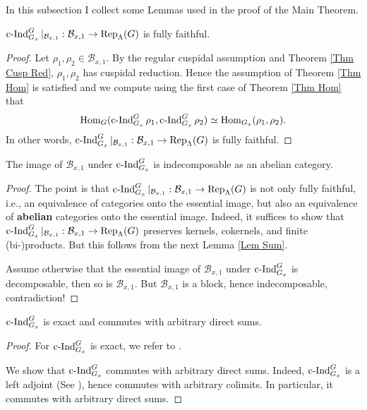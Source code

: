 	In this subsection I collect some Lemmas used in the proof of the Main Theorem.
	
	\begin{lemma}\label{Lem Thm Hom implies fully faithful}
		$\operatorname{\operatorname{c-Ind}}_{G_x}^G|_{\mathcal{B}_{x,1}}: \mathcal{B}_{x,1} \to \operatorname{\operatorname{Rep}}_{\Lambda}(G)$ is fully faithful.
	\end{lemma}
	
	\begin{proof}
		Let $\rho_1, \rho_2 \in \mathcal{B}_{x,1}$. By the regular cuspidal assumption and Theorem \ref{Thm Cusp Red}, $\rho_1, \rho_2$ has cuspidal reduction. Hence the assumption of Theorem \ref{Thm Hom} is satisfied and we compute using the first case of Theorem \ref{Thm Hom} that
		$$\operatorname{\operatorname{Hom}}_G(\operatorname{\operatorname{c-Ind}}_{G_x}^G\rho_1, \operatorname{\operatorname{c-Ind}}_{G_x}^G\rho_2) \simeq \operatorname{\operatorname{Hom}}_{G_x}(\rho_1, \rho_2).$$
		In other words, $\operatorname{\operatorname{c-Ind}}_{G_x}^G|_{\mathcal{B}_{x,1}}: \mathcal{B}_{x,1} \to \operatorname{\operatorname{Rep}}_{\Lambda}(G)$ is fully faithful.
	\end{proof}
	
	\begin{lemma}\label{Lem Indec}
		The image of $\mathcal{B}_{x,1}$ under $\operatorname{\operatorname{c-Ind}}_{G_x}^G$ is indecomposable as an abelian category.
	\end{lemma}
	
	\begin{proof}
		The point is that $\operatorname{\operatorname{c-Ind}}_{G_x}^G|_{\mathcal{B}_{x,1}}: \mathcal{B}_{x,1} \to \operatorname{\operatorname{Rep}}_{\Lambda}(G)$ is not only fully faithful, i.e., an equivalence of categories onto the essential image, but also an equivalence of \textbf{abelian} categories onto the essential image. Indeed, it suffices to show that $\operatorname{\operatorname{c-Ind}}_{G_x}^G|_{\mathcal{B}_{x,1}}: \mathcal{B}_{x,1} \to \operatorname{\operatorname{Rep}}_{\Lambda}(G)$ preserves kernels, cokernels, and finite (bi-)products. But this follows from the next Lemma \ref{Lem Sum}.
		
		Assume otherwise that the essential image of $\mathcal{B}_{x,1}$ under $\operatorname{\operatorname{c-Ind}}_{G_x}^G$ is decomposable, then so is $\mathcal{B}_{x,1}$. But $\mathcal{B}_{x,1}$ is a block, hence indecomposable, contradiction!
	\end{proof}
	
	\begin{lemma}\label{Lem Sum}
		$\operatorname{\operatorname{c-Ind}}_{G_x}^G$ is exact and commutes with arbitrary direct sums.
	\end{lemma}
	
	\begin{proof}
		For $\operatorname{\operatorname{c-Ind}}_{G_x}^G$ is exact, we refer to \cite[I.5.10]{vigneras1996representations}.
		
		We show that $\operatorname{\operatorname{c-Ind}}_{G_x}^G$ commutes with arbitrary direct sums. Indeed, $\operatorname{\operatorname{c-Ind}}_{G_x}^G$ is a left adjoint (See \cite[I.5.7]{vigneras1996representations}), hence commutes with arbitrary colimits. In particular, it commutes with arbitrary direct sums.
	\end{proof}
	
